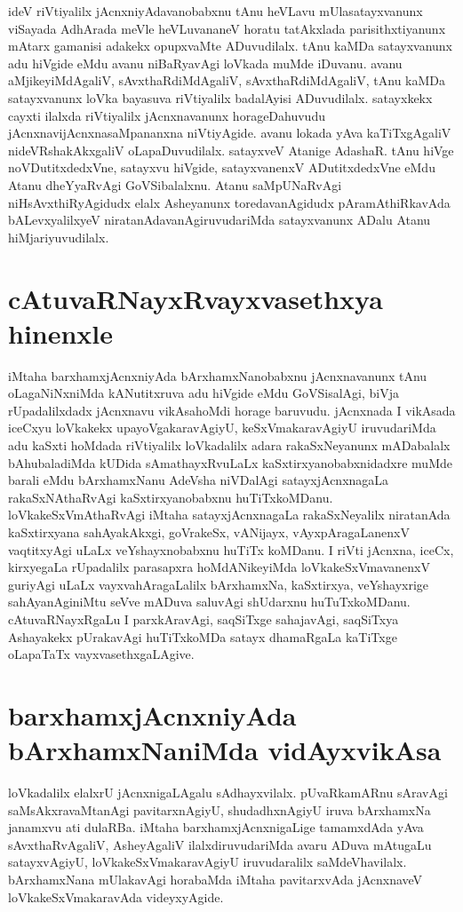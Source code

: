 ideV riVtiyalilx jAcnxniyAdavanobabxnu tAnu heVLavu mUlasatayxvanunx viSayada AdhArada meVle heVLuvananeV horatu tatAkxlada parisithxtiyanunx mAtarx gamanisi adakekx opupxvaMte ADuvudilalx. tAnu kaMDa satayxvanunx adu hiVgide eMdu avanu niBaRyavAgi loVkada muMde iDuvanu. avanu aMjikeyiMdAgaliV, sAvxthaRdiMdAgaliV, sAvxthaRdiMdAgaliV, tAnu kaMDa satayxvanunx loVka bayasuva riVtiyalilx badalAyisi ADuvudilalx. satayxkekx cayxti ilalxda riVtiyalilx jAcnxnavanunx horageDahuvudu jAcnxnavijAcnxnasaMpananxna niVtiyAgide. avanu lokada yAva kaTiTxgAgaliV nideVRshakAkxgaliV oLapaDuvudilalx. satayxveV Atanige AdashaR. tAnu hiVge noVDutitxdedxVne, satayxvu hiVgide, satayxvanenxV ADutitxdedxVne eMdu Atanu dheYyaRvAgi GoVSibalalxnu. Atanu saMpUNaRvAgi niHsAvxthiRyAgidudx elalx Asheyanunx toredavanAgidudx pAramAthiRkavAda bALevxyalilxyeV niratanAdavanAgiruvudariMda satayxvanunx ADalu Atanu hiMjariyuvudilalx. 

\section*{cAtuvaRNayxRvayxvasethxya hinenxle}

iMtaha barxhamxjAcnxniyAda bArxhamxNanobabxnu jAcnxnavanunx tAnu oLagaNiNxniMda kANutitxruva adu hiVgide eMdu GoVSisalAgi, biVja rUpadalilxdadx jAcnxnavu vikAsahoMdi horage baruvudu. jAcnxnada I vikAsada iceCxyu loVkakekx upayoVgakaravAgiyU, keSxVmakaravAgiyU iruvudariMda adu kaSxti hoMdada riVtiyalilx loVkadalilx adara rakaSxNeyanunx mADabalalx bAhubaladiMda kUDida sAmathayxRvuLaLx kaSxtirxyanobabxnidadxre muMde barali eMdu bArxhamxNanu AdeVsha niVDalAgi satayxjAcnxnagaLa rakaSxNAthaRvAgi kaSxtirxyanobabxnu huTiTxkoMDanu. loVkakeSxVmAthaRvAgi iMtaha satayxjAcnxnagaLa rakaSxNeyalilx niratanAda kaSxtirxyana sahAyakAkxgi, goVrakeSx, vANijayx, vAyxpAragaLanenxV vaqtitxyAgi uLaLx veYshayxnobabxnu huTiTx koMDanu. I riVti jAcnxna, iceCx, kirxyegaLa rUpadalilx parasapxra hoMdANikeyiMda loVkakeSxVmavanenxV guriyAgi uLaLx vayxvahAragaLalilx bArxhamxNa, kaSxtirxya, veYshayxrige sahAyanAginiMtu seVve mADuva saluvAgi shUdarxnu huTuTxkoMDanu. cAtuvaRNayxRgaLu I parxkAravAgi, saqSiTxge sahajavAgi, saqSiTxya Ashayakekx pUrakavAgi huTiTxkoMDa satayx dhamaRgaLa kaTiTxge oLapaTaTx vayxvasethxgaLAgive.

\section*{barxhamxjAcnxniyAda bArxhamx‌NaniMda vidAyxvikAsa}

loVkadalilx elalxrU jAcnxnigaLAgalu sAdhayxvilalx. pUvaRkamARnu sAravAgi saMsAkxravaMtanAgi pavitarxnAgiyU, shudadhxnAgiyU iruva bArxhamxNa janamxvu ati dulaRBa. iMtaha barxhamxjAcnxnigaLige tamamxdAda yAva sAvxthaRvAgaliV, AsheyAgaliV ilalxdiruvudariMda avaru ADuva mAtugaLu satayxvAgiyU, loVkakeSxVmakaravAgiyU iruvudaralilx saMdeVhavilalx. bArxhamxNana mUlakavAgi horabaMda iMtaha pavitarxvAda jAcnxnaveV loVkakeSxVmakaravAda videyxyAgide.

